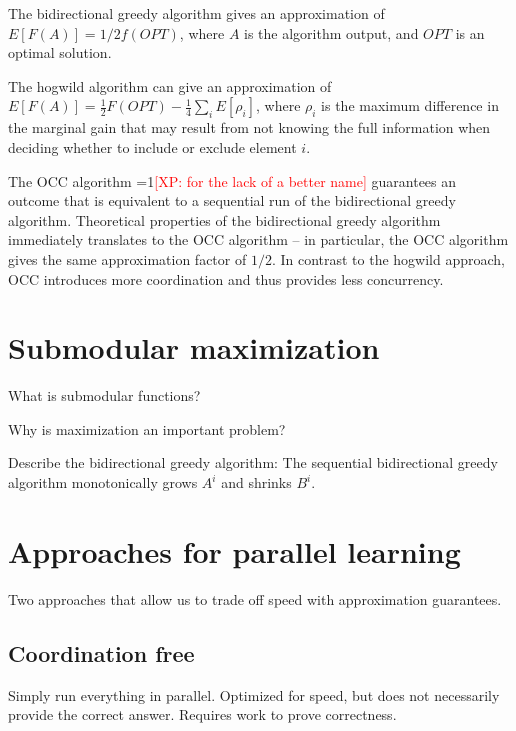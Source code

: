 \documentclass{article} %
\newcommand{\Comments}{1}
\newcommand{\note}[2]{\ifnum\Comments=1\textcolor{#1}{#2}\fi}
\newcommand{\xinghao}[1]{\note{red}{[XP: #1]}}
\begin{document}
The bidirectional greedy algorithm \cite{buchbinder2012} gives an approximation of $E[F(A)] = 1/2 f(OPT)$, where $A$ is the algorithm output, and $OPT$ is an optimal solution.

The hogwild algorithm can give an approximation of $E[F(A)] = \frac{1}{2} F(OPT) - \frac{1}{4}\sum_iE[\rho_i]$, where $\rho_i$ is the maximum difference in the marginal gain that may result from not knowing the full information when deciding whether to include or exclude element $i$.

The OCC algorithm \xinghao{for the lack of a better name} guarantees an outcome that is equivalent to a sequential run of the bidirectional greedy algorithm.
Theoretical properties of the bidirectional greedy algorithm immediately translates to the OCC algorithm -- in particular, the OCC algorithm gives the same approximation factor of $1/2$.
In contrast to the hogwild approach, OCC introduces more coordination and thus provides less concurrency.











\section{Submodular maximization}

What is submodular functions?

Why is maximization an important problem?

Describe the bidirectional greedy algorithm:
The sequential bidirectional greedy \cite{buchbinder2012} algorithm monotonically grows $A^i$ and shrinks $B^i$.









\section{Approaches for parallel learning}

Two approaches that allow us to trade off speed with approximation guarantees.

\subsection{Coordination free}
Simply run everything in parallel.
Optimized for speed, but does not necessarily provide the correct answer.
Requires work to prove correctness.
\end{document}
